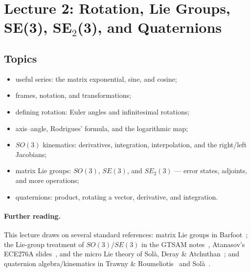 \section{Lecture 2: Rotation, Lie Groups, SE(3), SE\texorpdfstring{$_2$}{2}(3), and Quaternions}
\label{sec:lecture02}

\subsection{Topics}
\begin{itemize}[itemsep=0.3em]
\item useful series: the matrix exponential, sine, and cosine;
\item frames, notation, and transformations;
\item defining rotation: Euler angles and infinitesimal rotations;
\item axis--angle, Rodrigues' formula, and the logarithmic map;
\item $SO(3)$ kinematics: derivatives, integration, interpolation, and the right/left Jacobians;
\item matrix Lie groups: $SO(3)$, $SE(3)$, and $SE_2(3)$ --- error states, adjoints, and more operations;
\item quaternions: product, rotating a vector, derivative, and integration.
\end{itemize}

\paragraph{Further reading.} This lecture draws on several standard references: matrix Lie groups in Barfoot~\cite[Ch.~7]{Barfoot2017StateEstimation}; the Lie-group treatment of $SO(3)$/$SE(3)$ in the GTSAM notes~\cite{DellaertGTSAMLieGroups}, Atanasov's ECE276A slides~\cite{Atanasov2020SO3SE3}, and the micro Lie theory of Sol\`a, Deray \& Atchuthan~\cite{Sola2018MicroLie}; and quaternion algebra/kinematics in Trawny \& Roumeliotis~\cite[Sec.~1]{Trawny2005Quaternion} and Sol\`a~\cite[Sec.~1--3]{Sola2017Quaternion}.

